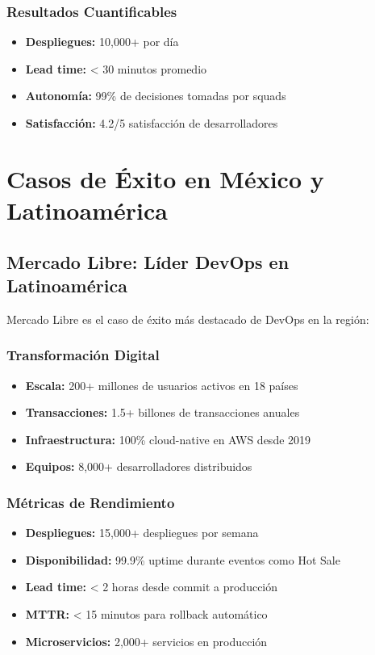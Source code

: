 \documentclass[12pt,a4paper]{article}
\begin{document}
\subsubsection{Resultados Cuantificables}
\begin{itemize}
    \item \textbf{Despliegues:} 10,000+ por día
    \item \textbf{Lead time:} < 30 minutos promedio
    \item \textbf{Autonomía:} 99\% de decisiones tomadas por squads
    \item \textbf{Satisfacción:} 4.2/5 satisfacción de desarrolladores
\end{itemize}

\section{Casos de Éxito en México y Latinoamérica}

\subsection{Mercado Libre: Líder DevOps en Latinoamérica}
Mercado Libre es el caso de éxito más destacado de DevOps en la región:

\subsubsection{Transformación Digital}
\begin{itemize}
    \item \textbf{Escala:} 200+ millones de usuarios activos en 18 países
    \item \textbf{Transacciones:} 1.5+ billones de transacciones anuales
    \item \textbf{Infraestructura:} 100\% cloud-native en AWS desde 2019
    \item \textbf{Equipos:} 8,000+ desarrolladores distribuidos
\end{itemize}

\subsubsection{Métricas de Rendimiento}
\begin{itemize}
    \item \textbf{Despliegues:} 15,000+ despliegues por semana
    \item \textbf{Disponibilidad:} 99.9\% uptime durante eventos como Hot Sale
    \item \textbf{Lead time:} < 2 horas desde commit a producción
    \item \textbf{MTTR:} < 15 minutos para rollback automático
    \item \textbf{Microservicios:} 2,000+ servicios en producción
\end{itemize}
\end{document}
